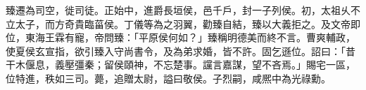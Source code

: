 \begin{pinyinscope}
 
臻遷為司空，徙司徒。正始中，進爵長垣侯，邑千戶，封一子列侯。初，太祖乆不立太子，而方奇貴臨菑侯。丁儀等為之羽翼，勸臻自結，臻以大義拒之。及文帝即位，東海王霖有寵，帝問臻：「平原侯何如？」臻稱明德美而終不言。曹爽輔政，使夏侯玄宣指，欲引臻入守尚書令，及為弟求婚，皆不許。固乞遜位。詔曰：「昔干木偃息，義壓彊秦；留侯頤神，不忘楚事。讜言嘉謀，望不吝焉。」賜宅一區，位特進，秩如三司。薨，追贈太尉，謚曰敬侯。子烈嗣，咸熈中為光祿勳。
 
 
\end{pinyinscope}